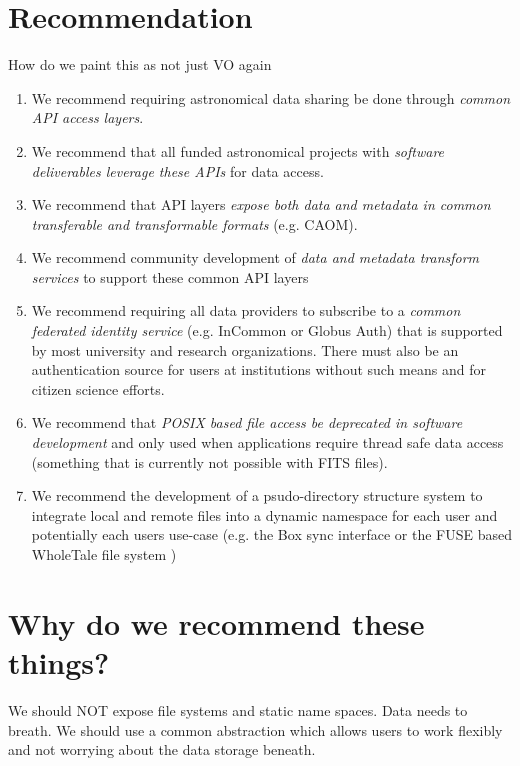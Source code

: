 \section{Recommendation }

How do we paint this as not just VO again

\begin{enumerate}
\item We recommend requiring astronomical data sharing be done through \emph{common API
access layers}.

\item We recommend that all funded astronomical projects with \emph{software deliverables
leverage these APIs} for data access.

\item We recommend that API layers \emph{expose both data and metadata in common
transferable and transformable formats} (e.g. CAOM).

\item We recommend community development of \emph{data and metadata transform services}
to support these common API layers

\item We recommend requiring all data providers to subscribe to a
\emph{common federated identity service} (e.g. InCommon or
Globus Auth) that is supported by most university and research organizations. There
must also be
an authentication source for users at institutions without such means and for
citizen science efforts.

\item We recommend that \emph{POSIX based file access be deprecated
in software development} and only used when applications require thread safe
data access (something that is currently not possible with FITS files).

\item We recommend the development of a psudo-directory structure system to
integrate local and remote files into a dynamic namespace for each user and potentially
each users use-case (e.g. the Box sync interface or the FUSE based WholeTale file system
\citep{BRINCKMAN2019854})


\end{enumerate}

\section{Why do we recommend these things?}


We should NOT expose file systems and static name spaces.  Data needs to breath. We should use a common abstraction which allows users to work flexibly and not worrying about the data storage beneath.

